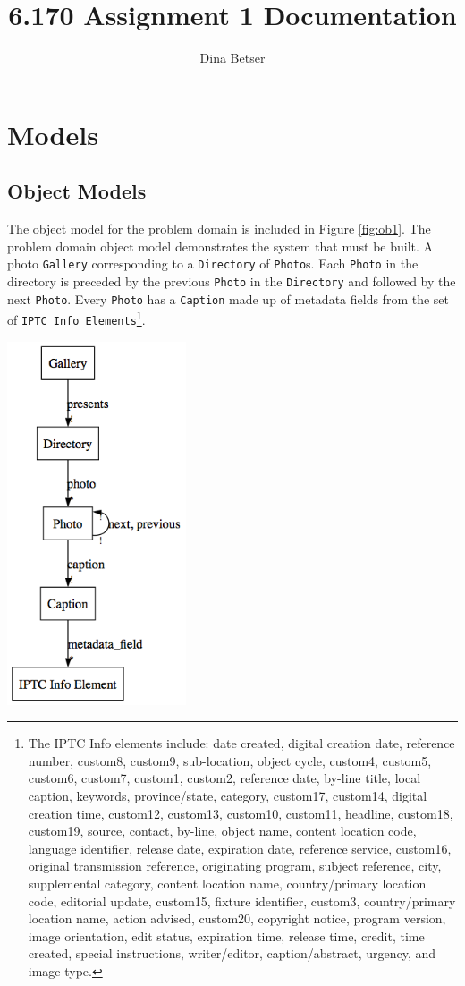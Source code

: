 \documentclass[11pt,letterpaper]{article}
\title{6.170 Assignment 1 Documentation}
\author{Dina Betser}
\begin{document}
\maketitle

\section{Models}
\subsection{Object Models}
The object model for the problem domain is included in Figure \ref{fig:ob1}. The problem domain object model demonstrates the system that must be built. A photo \texttt{Gallery} corresponding to a \texttt{Directory} of \texttt{Photo}s. Each \texttt{Photo} in the directory is preceded by the previous \texttt{Photo} in the \texttt{Directory} and followed by the next \texttt{Photo}. Every \texttt{Photo} has a \texttt{Caption} made up of metadata fields from the set of \texttt{IPTC Info Elements}\footnote{The IPTC Info elements include: date created, digital creation date, reference number, custom8, custom9, sub-location, object cycle, custom4, custom5, custom6, custom7, custom1, custom2, reference date, by-line title, local caption, keywords, province/state, category, custom17, custom14, digital creation time, custom12, custom13, custom10, custom11, headline, custom18, custom19, source, contact, by-line, object name, content location code, language identifier, release date, expiration date, reference service, custom16, original transmission reference, originating program, subject reference, city, supplemental category, content location name, country/primary location code, editorial update, custom15, fixture identifier, custom3, country/primary location name, action advised, custom20, copyright notice, program version, image orientation, edit status, expiration time, release time, credit, time created, special instructions, writer/editor, caption/abstract, urgency, and image type.}.
\begin{center}
\includegraphics[width=150pt]{dot/obmodproblem.png}
\label{fig:ob1} 
\end{center}
\end{document}
